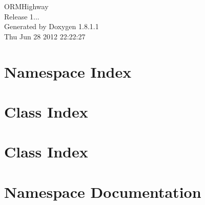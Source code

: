\documentclass{book}
\begin{document}
\hypersetup{pageanchor=false,citecolor=blue}
\begin{titlepage}
\vspace*{7cm}
\begin{center}
{\Large O\-R\-M\-Highway \\[1ex]\large Release 1... }\\
\vspace*{1cm}
{\large Generated by Doxygen 1.8.1.1}\\
\vspace*{0.5cm}
{\small Thu Jun 28 2012 22:22:27}\\
\end{center}
\end{titlepage}
\clearemptydoublepage
{}
\tableofcontents
\clearemptydoublepage
{}
\hypersetup{pageanchor=true,citecolor=blue}
\chapter{Namespace Index}

\chapter{Class Index}

\chapter{Class Index}

\chapter{Namespace Documentation}

























\end{document}
